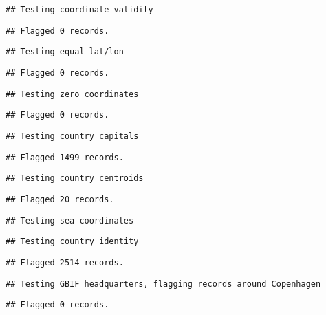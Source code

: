 \documentclass[
]{article}
\begin{document}
\begin{verbatim}
## Testing coordinate validity
\end{verbatim}

\begin{verbatim}
## Flagged 0 records.
\end{verbatim}

\begin{verbatim}
## Testing equal lat/lon
\end{verbatim}

\begin{verbatim}
## Flagged 0 records.
\end{verbatim}

\begin{verbatim}
## Testing zero coordinates
\end{verbatim}

\begin{verbatim}
## Flagged 0 records.
\end{verbatim}

\begin{verbatim}
## Testing country capitals
\end{verbatim}

\begin{verbatim}
## Flagged 1499 records.
\end{verbatim}

\begin{verbatim}
## Testing country centroids
\end{verbatim}

\begin{verbatim}
## Flagged 20 records.
\end{verbatim}

\begin{verbatim}
## Testing sea coordinates
\end{verbatim}

\begin{verbatim}
## Testing country identity
\end{verbatim}

\begin{verbatim}
## Flagged 2514 records.
\end{verbatim}

\begin{verbatim}
## Testing GBIF headquarters, flagging records around Copenhagen
\end{verbatim}

\begin{verbatim}
## Flagged 0 records.
\end{verbatim}
\end{document}
